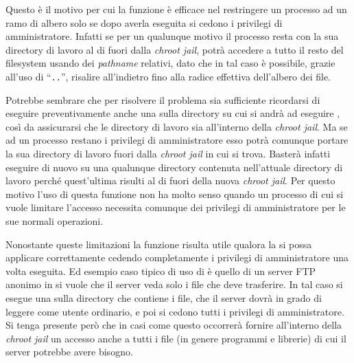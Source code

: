Questo è il motivo per cui la funzione è efficace nel restringere un processo
ad un ramo di albero solo se dopo averla eseguita si cedono i privilegi di
amministratore. Infatti se per un qualunque motivo il processo resta con la
sua directory di lavoro al di fuori dalla \textit{chroot jail}, potrà accedere
a tutto il resto del filesystem usando dei \textit{pathname} relativi, dato
che in tal caso è possibile, grazie all'uso di ``\texttt{..}'', risalire
all'indietro fino alla radice effettiva dell'albero dei file.

Potrebbe sembrare che per risolvere il problema sia sufficiente ricordarsi di
eseguire preventivamente anche una  sulla directory su cui si
andrà ad eseguire , così da assicurarsi che le directory di
lavoro sia all'interno della \textit{chroot jail}.  Ma se ad un processo
restano i privilegi di amministratore esso potrà comunque portare la sua
directory di lavoro fuori dalla \textit{chroot jail} in cui si trova. Basterà
infatti eseguire di nuovo  su una qualunque directory contenuta
nell'attuale directory di lavoro perché quest'ultima risulti al di fuori della
nuova \textit{chroot jail}.  Per questo motivo l'uso di questa funzione non ha
molto senso quando un processo di cui si vuole limitare l'accesso necessita
comunque dei privilegi di amministratore per le sue normali operazioni.

Nonostante queste limitazioni la funzione risulta utile qualora la si possa
applicare correttamente cedendo completamente i privilegi di amministratore
una volta eseguita.  Ed esempio caso tipico di uso di  è quello
di un server FTP anonimo in si vuole che il server veda solo i file che deve
trasferire. In tal caso si esegue una  sulla directory che
contiene i file, che il server dovrà in grado di leggere come utente
ordinario, e poi si cedono tutti i privilegi di amministratore.  Si tenga
presente però che in casi come questo occorrerà fornire all'interno della
\textit{chroot jail} un accesso anche a tutti i file (in genere programmi e
librerie) di cui il server potrebbe avere bisogno.


